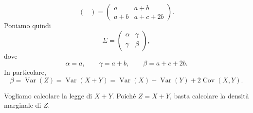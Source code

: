 \documentclass[a4paper]{article}
\begin{document}
\begin{snippetexercise}{}
\[\begin{pmatrix}
        \end{pmatrix}
        =
        \begin{pmatrix}
            a & a+b \\ a+b & a+c+2b
        \end{pmatrix}.
    \]
    Poniamo quindi
    \[
        \Sigma =
        \begin{pmatrix}
            \alpha & \gamma \\
            \gamma & \beta
        \end{pmatrix},
    \]
    dove
    \[
        \alpha = a, \qquad
        \gamma = a+b, \qquad
        \beta = a+c+2b.
    \]
    In particolare,
    \[
        \beta
        =
        \operatorname{Var}(Z)
        =
        \operatorname{Var}(X+Y)
        =
        \operatorname{Var}(X)
        +
        \operatorname{Var}(Y)
        +
        2\operatorname{Cov}(X,Y).
    \]

    Vogliamo calcolare la legge di \(X+Y\). Poiché \(Z=X+Y\),
    basta calcolare la densità marginale di \(Z\).


\end{snippetexercise}
\end{document}
